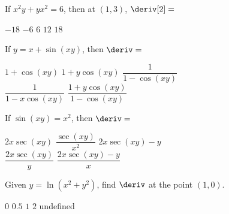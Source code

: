 \begin{questions}
    \question If $x^2y + yx^2 = 6$, then at $(1, 3)$, $\deriv[2] = $ \\

    \begin{oneparchoices}
        \choice $-18$
        \choice $-6$
        \choice $6$
        \choice $12$
        \choice $18$
    \end{oneparchoices} \par \horizontalline

    \question If $y = x + \sin (xy)$, then $\deriv = $ \\
    
    \begin{oneparchoices}
        \choice $1 + \cos (xy)$
        \choice $1 + y\cos (xy)$
        \choice $\dfrac{1}{1 - \cos (xy)}$ \\[11pt]
        \makebox[0.22\textwidth] \choice $\dfrac{1}{1 - x\cos (xy)}$
        \makebox[0.24\textwidth] \choice $\dfrac{1 + y\cos (xy)}{1 - \cos (xy)}$
    \end{oneparchoices} \par \horizontalline

    \question If $\sin (xy) = x^2$, then $\deriv = $ \\

    \begin{oneparchoices}
        \choice $2x\sec (xy)$
        \choice $\dfrac{\sec (xy)}{x^2}$
        \choice $2x\sec (xy) - y$ \\[11pt]
        \makebox[0.22\textwidth] \choice $\dfrac{2x\sec (xy)}{y}$
        \makebox[0.25\textwidth] \choice $\dfrac{2x\sec (xy) - y}{x}$
    \end{oneparchoices} \par \horizontalline

    \question Given $y = \ln \left(x^2 + y^2\right)$, find $\deriv$ at the point $(1, 0)$. \\

    \begin{oneparchoices}
        \choice $0$
        \choice $0.5$
        \choice $1$
        \choice $2$
        \choice undefined
    \end{oneparchoices} \par \horizontalline
\end{questions} 